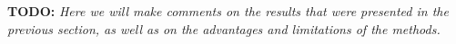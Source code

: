 \textbf{TODO: }
\textit{Here we will make comments on the results that were presented in the previous section, as well as on the advantages and limitations of the methods.}
